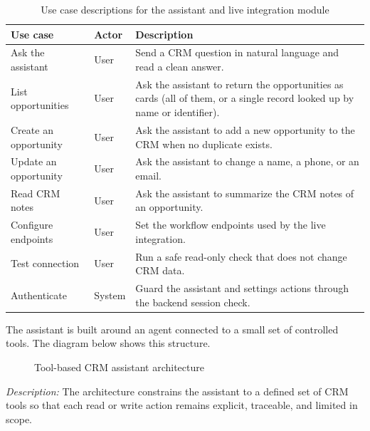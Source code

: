 \documentclass[12pt,a4paper,oneside]{report}
\newcommand{\figdesc}[1]{%
\vspace{-0.05cm}\noindent\small\textit{Description:} #1\par\normalsize\vspace{0.30cm}%
}
\begin{document}
\begin{table}[H]
\centering
\small
\begin{tabularx}{\textwidth}{|p{3.6cm}|p{2.2cm}|X|}
\hline\rowcolor{TabHead}
\textbf{Use case} & \textbf{Actor} & \textbf{Description} \\
\hline
Ask the assistant & User & Send a CRM question in natural language and read a clean answer. \\
\hline
List opportunities & User & Ask the assistant to return the opportunities as cards (all of them, or a single record looked up by name or identifier). \\
\hline
Create an opportunity & User & Ask the assistant to add a new opportunity to the CRM when no duplicate exists. \\
\hline
Update an opportunity & User & Ask the assistant to change a name, a phone, or an email. \\
\hline
Read CRM notes & User & Ask the assistant to summarize the CRM notes of an opportunity. \\
\hline
Configure endpoints & User & Set the workflow endpoints used by the live integration. \\
\hline
Test connection & User & Run a safe read-only check that does not change CRM data. \\
\hline
Authenticate & System & Guard the assistant and settings actions through the backend session check. \\
\hline
\end{tabularx}
\caption{Use case descriptions for the assistant and live integration module}
\end{table}

The assistant is built around an agent connected to a small set of controlled tools. The diagram below shows this structure.

\begin{figure}[H]
\centering
{}
\caption{Tool-based CRM assistant architecture}
\end{figure}
\figdesc{The architecture constrains the assistant to a defined set of CRM tools so that each read or write action remains explicit, traceable, and limited in scope.}
\end{document}
